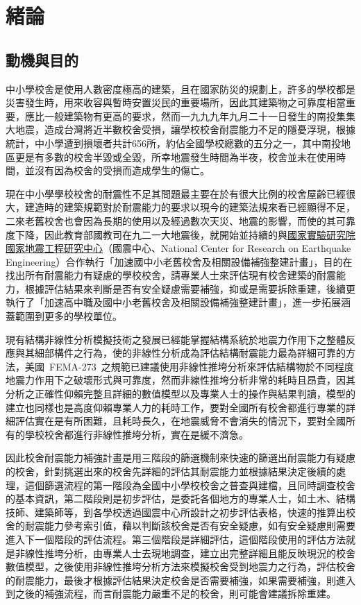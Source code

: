 % 
\chapter{緒論}
\label{cha:intro} 

\section{動機與目的}

中小學校舍是使用人數密度極高的建築，且在國家防災的規劃上，許多的學校都是災害發生時，用來收容與暫時安置災民的重要場所，因此其建築物之可靠度相當重要，應比一般建築物有更高的要求，然而一九九九年九月二十一日發生的南投集集大地震，造成台灣將近半數校舍受損，讓學校校舍耐震能力不足的隱憂浮現，根據統計，中小學遭到損壞者共計656所，約佔全國學校總數的五分之一，其中南投地區更是有多數的校舍半毀或全毀，所幸地震發生時間為半夜，校舍並未在使用時間，並沒有因為校舍的受損而造成學生的傷亡。

現在中小學學校校舍的耐震性不足其問題最主要在於有很大比例的校舍屋齡已經很大，建造時的建築規範對於耐震能力的要求以現今的建築法規來看已經顯得不足，二來老舊校舍也會因為長期的使用以及經過數次天災、地震的影響，而使的其可靠度下降，因此教育部國教司在九二一大地震後，就開始並持續的與\underline{國家實驗研究院國家地震工程研究中心}（國震中心、National Center for Research on Earthquake Engineering）合作執行「加速國中小老舊校舍及相關設備補強整建計畫」，目的在找出所有耐震能力有疑慮的學校校舍，請專業人士來評估現有校舍建築的耐震能力，根據評估結果來判斷是否有安全疑慮需要補強，抑或是需要拆除重建，後續更執行了「加速高中職及國中小老舊校舍及相關設備補強整建計畫」，進一步拓展涵蓋範圍到更多的學校單位。

現有結構非線性分析模擬技術之發展已經能掌握結構系統於地震力作用下之整體反應與其細部構件之行為，使的非線性分析成為評估結構耐震能力最為詳細可靠的方法，美國~FEMA-273\cite{building1997nehrp}~之規範已建議使用非線性推垮分析來評估結構物於不同程度地震力作用下之破壞形式與可靠度，然而非線性推垮分析非常的耗時且昂貴，因其分析之正確性仰賴完整且詳細的數值模型以及專業人士的操作與結果判讀，模型的建立也同樣也是高度仰賴專業人力的耗時工作，要對全國所有校舍都進行專業的詳細評估實在是有所困難，且耗時長久，在地震威脅不會消失的情況下，要對全國所有的學校校舍都進行非線性推垮分析，實在是緩不濟急。

因此校舍耐震能力補強計畫是用三階段的篩選機制來快速的篩選出耐震能力有疑慮的校舍，針對挑選出來的校舍先詳細的評估其耐震能力並根據結果決定後續的處理，這個篩選流程的第一階段為全國中小學校校舍之普查與建檔，且同時調查校舍的基本資訊，第二階段則是初步評估，是委託各個地方的專業人士，如土木、結構技師、建築師等，到各學校透過國震中心所設計之初步評估表格，快速的推算出校舍的耐震能力參考索引值，藉以判斷該校舍是否有安全疑慮，如有安全疑慮則需要進入下一個階段的評估流程。第三個階段是詳細評估，這個階段使用的評估方法就是非線性推垮分析，由專業人士去現地調查，建立出完整詳細且能反映現況的校舍數值模型，之後使用非線性推垮分析方法來模擬校舍受到地震力之行為，評估校舍的耐震能力，最後才根據評估結果決定校舍是否需要補強，如果需要補強，則進入到之後的補強流程，而言耐震能力嚴重不足的校舍，則可能會建議拆除重建。

